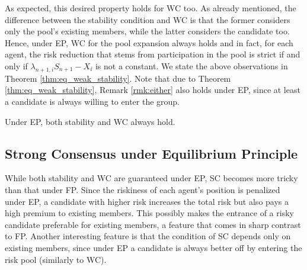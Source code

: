 \documentclass[fleqn,mnsc,nonblindrev]{informs4}
\begin{document}
As expected, this desired property holds for WC too. As already mentioned, the difference between the stability condition and WC is that the former considers only the pool's existing members, while the latter considers the candidate too. Hence, under EP, WC for the pool expansion always holds and in fact, for each agent, the risk reduction that stems from participation in the pool is strict if and only if $\lambda_{n+1,i}S_{n+1}-X_i$ is not a constant. 
We state the above observations in   {Theorem \ref{thm:eq_weak_stability}}. Note that due to Theorem \ref{thm:eq_weak_stability}, Remark \ref{rmk:either} also holds under EP, since at least a candidate is always willing to enter the group. 
\begin{theorem}\label{thm:eq_weak_stability}
Under EP, both stability and WC always hold. 
\end{theorem}

\subsection{Strong Consensus under Equilibrium Principle}
While both stability and WC are guaranteed under EP, SC becomes more tricky than that under FP. Since the riskiness of each agent's position is penalized under EP, a candidate with higher risk increases the total risk but also pays a high premium to existing members. This possibly makes the entrance of a risky candidate preferable for existing members, a feature that comes in sharp contrast to FP. Another interesting feature is that the condition of SC depends only on existing members, since under EP a candidate is always better off by entering the risk pool (similarly to WC). 
\end{document}
